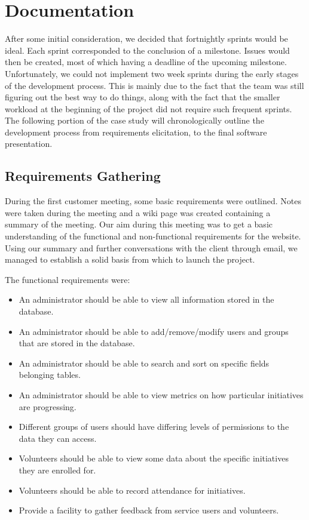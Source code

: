 \documentclass{l3proj}
\begin{document}
\section{Documentation}
\label{documentation}

After some initial consideration, we decided that fortnightly sprints would be ideal. Each sprint corresponded to the conclusion of a milestone. Issues would then be created, most of which having a deadline of the upcoming milestone. Unfortunately, we could not implement two week sprints during the early stages of the development process. This is mainly due to the fact that the team was still figuring out the best way to do things, along with the fact that the smaller workload at the beginning of the project did not require such frequent sprints. The following portion of the case study will chronologically outline the development process from requirements elicitation, to the final software presentation.

\subsection{Requirements Gathering}
\label{requirements}

During the first customer meeting, some basic requirements were outlined. Notes were taken during the meeting and a wiki page was created containing a summary of the meeting. Our aim during this meeting was to get a basic understanding of the functional and non-functional requirements for the website. Using our summary and further conversations with the client through email, we managed to establish a solid basis from which to launch the project.

The functional requirements were:
\begin{itemize}
\item An administrator should be able to view all information stored in the database.
\item An administrator should be able to add/remove/modify users and groups that are stored in the database.
\item An administrator should be able to search and sort on specific fields belonging tables.
\item An administrator should be able to view metrics on how particular initiatives are progressing.
\item Different groups of users should have differing levels of permissions to the data they can access.
\item Volunteers should be able to view some data about the specific initiatives they are enrolled for.
\item Volunteers should be able to record attendance for initiatives.
\item Provide a facility to gather feedback from service users and volunteers.
\end{itemize}
\end{document}

